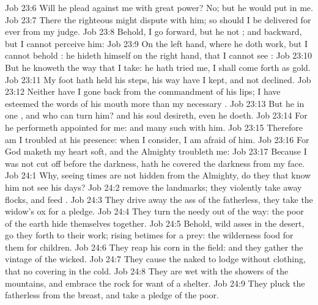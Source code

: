 \vs Job 23:6 Will he plead against me with  great power? No; but he would put  in me.
\vs Job 23:7 There the righteous might dispute with him; so should I be delivered for ever from my judge.
\vs Job 23:8 Behold, I go forward, but he  not ; and backward, but I cannot perceive him:
\vs Job 23:9 On the left hand, where he doth work, but I cannot behold : he hideth himself on the right hand, that I cannot see :
\vs Job 23:10 But he knoweth the way that I take:  he hath tried me, I shall come forth as gold.
\vs Job 23:11 My foot hath held his steps, his way have I kept, and not declined.
\vs Job 23:12 Neither have I gone back from the commandment of his lips; I have esteemed the words of his mouth more than my necessary .
\vs Job 23:13 But he  in one , and who can turn him? and  his soul desireth, even  he doeth.
\vs Job 23:14 For he performeth  appointed for me: and many such  with him.
\vs Job 23:15 Therefore am I troubled at his presence: when I consider, I am afraid of him.
\vs Job 23:16 For God maketh my heart soft, and the Almighty troubleth me:
\vs Job 23:17 Because I was not cut off before the darkness,  hath he covered the darkness from my face.
\vs Job 24:1 Why, seeing times are not hidden from the Almighty, do they that know him not see his days?
\vs Job 24:2  remove the landmarks; they violently take away flocks, and feed .
\vs Job 24:3 They drive away the ass of the fatherless, they take the widow's ox for a pledge.
\vs Job 24:4 They turn the needy out of the way: the poor of the earth hide themselves together.
\vs Job 24:5 Behold,  wild asses in the desert, go they forth to their work; rising betimes for a prey: the wilderness  food for them  for  children.
\vs Job 24:6 They reap  his corn in the field: and they gather the vintage of the wicked.
\vs Job 24:7 They cause the naked to lodge without clothing, that  no covering in the cold.
\vs Job 24:8 They are wet with the showers of the mountains, and embrace the rock for want of a shelter.
\vs Job 24:9 They pluck the fatherless from the breast, and take a pledge of the poor.
